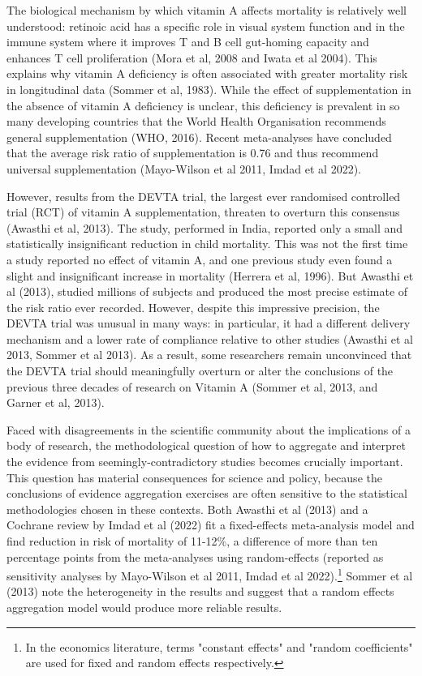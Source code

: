 \documentclass[12pt]{article}
\begin{document}
The biological mechanism by which vitamin A affects mortality is relatively well understood: retinoic acid has a specific role in visual system function and in the immune system where it improves T and B cell gut-homing capacity and enhances T cell proliferation (Mora et al, 2008 and Iwata et al 2004). This explains why vitamin A deficiency is often associated with greater mortality risk in longitudinal data (Sommer et al, 1983). While the effect of supplementation in the absence of vitamin A deficiency is unclear, this deficiency is prevalent in so many developing countries that the World Health Organisation recommends general supplementation (WHO, 2016). 
Recent meta-analyses have concluded that the average risk ratio of supplementation is 0.76 and thus recommend universal supplementation (Mayo-Wilson et al 2011, Imdad et al 2022). 

However, results from the DEVTA trial, the largest ever randomised controlled trial (RCT) 
of vitamin A supplementation, threaten to overturn this consensus (Awasthi et al, 2013). 
The study, performed in India, reported only a small and statistically insignificant 
reduction in child mortality. This was not the first time a study reported no effect 
of vitamin A, and one previous study even found a slight and insignificant increase 
in mortality (Herrera et al, 1996). But Awasthi et al (2013), studied millions of 
subjects and produced the most precise estimate 
of the risk ratio ever recorded. However, despite this impressive precision, the 
DEVTA trial was unusual in many ways: in particular, it had a different delivery 
mechanism and a lower rate of compliance relative to other studies 
(Awasthi et al 2013, Sommer et al 2013). As a result, some researchers remain unconvinced 
that the DEVTA trial should meaningfully overturn or alter the conclusions of the 
previous three decades of research on Vitamin A (Sommer et al, 2013, and Garner et al, 2013).

Faced with disagreements in the scientific community about the implications 
of a body of research, the methodological question of how to aggregate and interpret 
the evidence from seemingly-contradictory studies becomes crucially important. 
This question has material consequences for science and policy, because the conclusions 
of evidence aggregation exercises are often sensitive to the statistical methodologies 
chosen in these contexts. Both Awasthi et al (2013) and a Cochrane review by Imdad et al (2022) fit a fixed-effects meta-analysis model and find reduction in risk of mortality of 11-12\%, a difference of more than ten percentage points from the meta-analyses using random-effects (reported as sensitivity analyses by Mayo-Wilson et al 2011, Imdad et al 2022).\footnote{In the economics literature, terms "constant effects" and "random coefficients" are used for fixed and random effects respectively.} Sommer et al (2013) note the heterogeneity in the results and suggest that a random effects aggregation model would produce more reliable results. 
\end{document}
